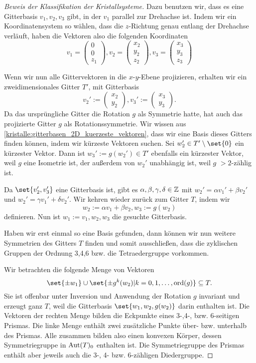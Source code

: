 \begin{proof}[Beweis der Klassifikation der Kristallsysteme]
\medbreak
Dazu benutzen wir, dass es eine Gitterbasis $v_1,v_2,v_3$ gibt, in der $v_1$ parallel zur Drehachse ist. Indem wir ein Koordinatensystem so wählen, dass die $z$-Richtung genau entlang der Drehachse verläuft, haben die Vektoren also die folgenden Koordinaten
\[v_1 = \begin{pmatrix} 0 \\ 0 \\ z_1 \end{pmatrix}, v_2 = \begin{pmatrix} x_2 \\ y_2 \\ z_2 \end{pmatrix}, v_3 = \begin{pmatrix} x_3 \\ y_3 \\ z_3 \end{pmatrix}\]

Wenn wir nun alle Gittervektoren in die $x$-$y$-Ebene projizieren, erhalten wir ein zweidimensionales Gitter $T'$, mit Gitterbasis
\[v_2' := \begin{pmatrix} x_2 \\ y_2\end{pmatrix}, v_3' := \begin{pmatrix} x_3 \\ y_3 \end{pmatrix}.\]
Da das ursprüngliche Gitter die Rotation $g$ als Symmetrie hatte, hat auch das projizierte Gitter $g$ als Rotationssymmetrie. Wir wissen aus \ref{kristalle:gitterbasen_2D_kuerzeste_vektoren}, dass wir eine Basis dieses Gitters finden können, indem wir kürzeste Vektoren suchen. Sei $w_2'\in T'\setminus\set{0}$ ein kürzester Vektor. Dann ist $w_3':=g(w_2')\in T'$ ebenfalls ein kürzester Vektor, weil $g$ eine Isometrie ist, der außerdem von $w_2'$ unabhängig ist, weil $g$ $>2$-zählig ist.

Da $\set{v_2',v_3'}$ eine Gitterbasis ist, gibt es $\alpha,\beta,\gamma,\delta\in\mathbb{Z}$ mit $w_2'=\alpha v_1'+\beta v_2'$ und $w_2'=\gamma v_1'+\delta v_2'$. Wir kehren wieder zurück zum Gitter $T$, indem wir
\[w_2:=\alpha v_1+\beta v_2, w_3 := g(w_2)\]
definieren. Nun ist $w_1:=v_1, w_2,w_3$ die gesuchte Gitterbasis.

\bigbreak
Haben wir erst einmal so eine Basis gefunden, dann können wir nun weitere Symmetrien des Gitters $T$ finden und somit ausschließen, dass die zyklischen Gruppen der Ordnung 3,4,6 bzw. die Tetraedergruppe vorkommen.

Wir betrachten die folgende Menge von Vektoren
\[\set{\pm w_1}\cup\set{\pm g^k(w_2) | k=0,1,\ldots,\ord(g)} \subseteq T.\]
Sie ist offenbar unter Inversion und Anwendung der Rotation $g$ invariant und erzeugt ganz $T$, weil die Gitterbasis $\set{w_1,w_2,g(w_2)}$ darin enthalten ist. Die Vektoren der rechten Menge bilden die Eckpunkte eines 3-,4-, bzw. 6-seitigen Prismas. Die linke Menge enthält zwei zusätzliche Punkte über- bzw. unterhalb des Prismas. Alle zusammen bilden also einen konvexen Körper, dessen Symmetriegruppe in $\operatorname{Aut}(T)_0$ enthalten ist. Die Symmetriegruppe des Prismas enthält aber jeweils auch die 3-, 4- bzw. 6-zähligen Diedergruppe.


\end{proof}
